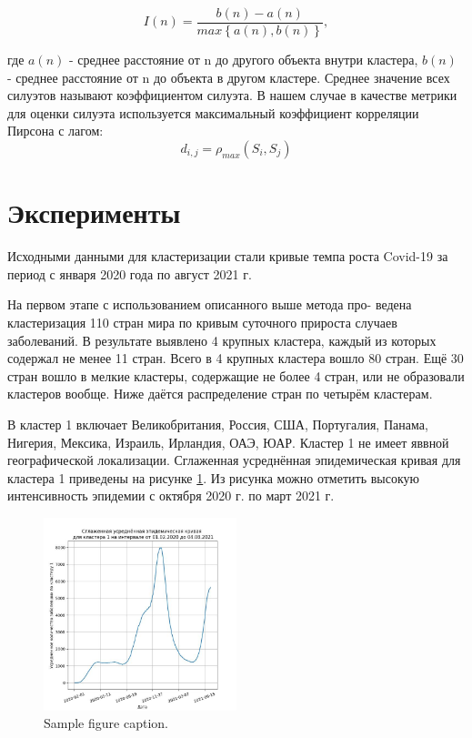 \documentclass{article}
\begin{document}
$$I(n) = \frac{b(n) - a(n)}{max\left\{a(n), b(n)\right\}},$$

где $a(n)$ - среднее расстояние от n до другого объекта внутри кластера, $b(n)$ - среднее расстояние от n до объекта в другом кластере. Среднее значение всех силуэтов называют коэффициентом силуэта.
В нашем случае в качестве метрики для оценки силуэта используется максимальный коэффициент корреляции Пирсона с лагом:
 $$d_{i,j} = \rho_{max}(S_i, S_j)$$

\section{Эксперименты}

Исходными данными для кластеризации стали кривые темпа роста Covid-19 за период с января 2020 года по август 2021 г.

На первом этапе с использованием описанного выше метода про-
ведена кластеризация 110 стран мира по кривым суточного прироста случаев заболеваний. В результате выявлено 4 крупных кластера, каждый из которых содержал не менее 11 стран. Всего в 4 крупных кластера вошло 80 стран. Ещё 30 стран вошло в мелкие кластеры, содержащие не более 4 стран, или не образовали кластеров вообще. Ниже даётся распределение стран по четырём кластерам.

В кластер 1 включает Великобритания, Россия, США, Португалия, Панама, Нигерия, Мексика, Израиль, Ирландия, ОАЭ, ЮАР. Кластер 1 не имеет яввной географической локализации. Сглаженная усреднённая эпидемическая кривая для кластера 1 приведены на рисунке \ref{fig:fig1}. Из рисунка можно отметить высокую интенсивность эпидемии с октября 2020 г. по март 2021 г.


\begin{figure}
	\centering
	\includegraphics[width=0.5\textwidth]{../figures/clasters1.jpg}
	\caption{Sample figure caption.}
	\label{fig:fig1}
\end{figure}
\end{document}
